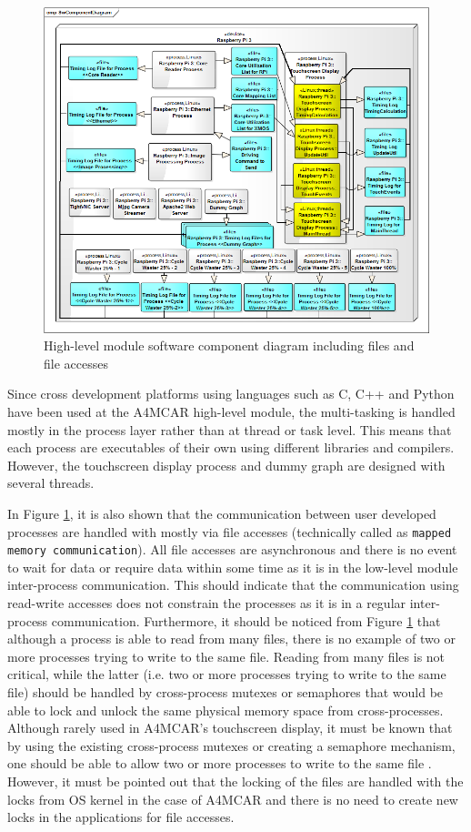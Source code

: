 \begin{figure}[!ht]
	\centering
	\captionsetup{justification=centering}
	\includegraphics[width=\textwidth]{content/images/rpicomponents.png}
	\caption{High-level module software component diagram including files and file accesses}
	\label{fig:rpicomponents}
\end{figure}

Since cross development platforms using languages such as C, C++ and Python have been used at the A4MCAR high-level module, the multi-tasking is handled mostly in the process layer rather than at thread or task level. This means that each process are executables of their own using different libraries and compilers. However, the touchscreen display process and dummy graph are designed with several threads.

In Figure \ref{fig:rpicomponents}, it is also shown that the communication between user developed processes are handled with mostly via file accesses (technically called as \texttt{mapped memory communication}). All file accesses are asynchronous and there is no event to wait for data or require data within some time as it is in the low-level module inter-process communication. This should indicate that the communication using read-write accesses does not constrain the processes as it is in a regular inter-process communication. Furthermore, it should be noticed from Figure \ref{fig:rpicomponents} that although a process is able to read from many files, there is no example of two or more processes trying to write to the same file. Reading from many files is not critical, while the latter (i.e. two or more processes trying to write to the same file) should be handled by cross-process mutexes or semaphores that would be able to lock and unlock the same physical memory space from cross-processes. Although rarely used in A4MCAR's touchscreen display, it must be known that by using the existing cross-process mutexes or creating a semaphore mechanism, one should be able to allow two or more processes to write to the same file \cite{linuxkernelbook}. However, it must be pointed out that the locking of the files are handled with the locks from OS kernel in the case of A4MCAR and there is no need to create new locks in the applications for file accesses. 

